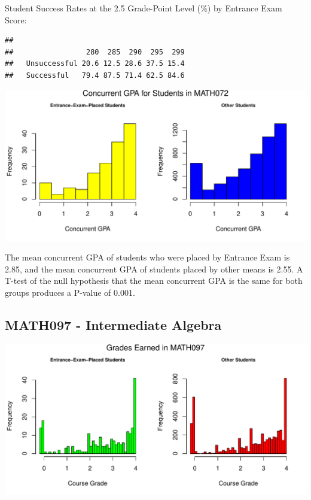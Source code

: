 \documentclass[twoside]{article}\usepackage[]{graphicx}\usepackage[]{color}
\makeatletter
\def\maxwidth{ %
  \ifdim\Gin@nat@width>\linewidth
    \linewidth
  \else
    \Gin@nat@width
  \fi
}
\newenvironment{kframe}{%
 \def\at@end@of@kframe{}%
 \ifinner\ifhmode%
  \def\at@end@of@kframe{\end{minipage}}%
  \begin{minipage}{\columnwidth}%
 \fi\fi%
 \def\FrameCommand##1{\hskip\@totalleftmargin \hskip-\fboxsep
 \colorbox{shadecolor}{##1}\hskip-\fboxsep
     \hskip-\linewidth \hskip-\@totalleftmargin \hskip\columnwidth}%
 \MakeFramed {\advance\hsize-\width
   \@totalleftmargin\z@ \linewidth\hsize
   \@setminipage}}%
 {\par\unskip\endMakeFramed%
 \at@end@of@kframe}
\newenvironment{knitrout}{}{} %
\makeatother
\begin{document}
Student Success Rates  at the 2.5 Grade-Point Level (\%) by Entrance Exam Score:

\begin{knitrout}
\color{fgcolor}\begin{kframe}
\begin{verbatim}
##               
##                 280  285  290  295  299
##   Unsuccessful 20.6 12.5 28.6 37.5 15.4
##   Successful   79.4 87.5 71.4 62.5 84.6
\end{verbatim}
\end{kframe}
\end{knitrout}


\begin{knitrout}
\color{fgcolor}
\includegraphics[width=\maxwidth]{figure/GPAgraphs072-1} 

\end{knitrout}

The mean concurrent GPA of students who were placed by Entrance Exam is 2.85, and the mean concurrent GPA of students placed by other means is 2.55.  A T-test of the null hypothesis that the mean concurrent GPA is the same for both groups produces a P-value of 0.001.

\newpage
\subsection{MATH097 - Intermediate Algebra}

\begin{knitrout}
\color{fgcolor}
\includegraphics[width=\maxwidth]{figure/graphs097-1} 

\end{knitrout}
\end{document}
